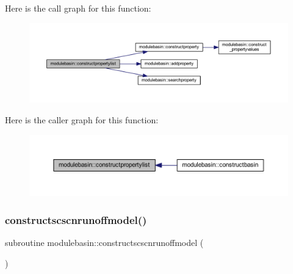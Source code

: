 Here is the call graph for this function\+:\nopagebreak
\begin{figure}[H]
\begin{center}
\leavevmode
\includegraphics[width=350pt]{namespacemodulebasin_a914a8d07507d5ca843132c144c8e61f7_cgraph}
\end{center}
\end{figure}
Here is the caller graph for this function\+:\nopagebreak
\begin{figure}[H]
\begin{center}
\leavevmode
\includegraphics[width=350pt]{namespacemodulebasin_a914a8d07507d5ca843132c144c8e61f7_icgraph}
\end{center}
\end{figure}
\mbox{\label{namespacemodulebasin_a5a5342d9e5be44e9161d8d4643071661}} 
\subsubsection{\texorpdfstring{constructscscnrunoffmodel()}{constructscscnrunoffmodel()}}
{\footnotesize\ttfamily subroutine modulebasin\+::constructscscnrunoffmodel (\begin{DoxyParamCaption}{ }\end{DoxyParamCaption})\hspace{0.3cm}{\ttfamily [private]}}


